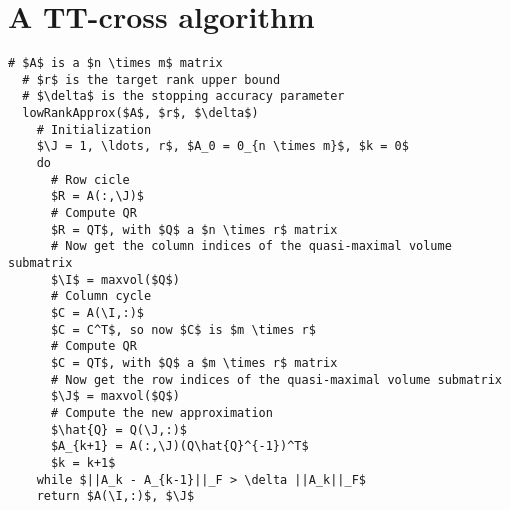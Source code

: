 \section{A TT-cross algorithm}
\begin{lstlisting}[float, caption=Low-rank approximation algorithm, label=algo:cross-approx, title=Low-rank approximation algorithm]
  # $A$ is a $n \times m$ matrix
  # $r$ is the target rank upper bound
  # $\delta$ is the stopping accuracy parameter
  lowRankApprox($A$, $r$, $\delta$)
    # Initialization
    $\J = 1, \ldots, r$, $A_0 = 0_{n \times m}$, $k = 0$
    do
      # Row cicle
      $R = A(:,\J)$
      # Compute QR
      $R = QT$, with $Q$ a $n \times r$ matrix
      # Now get the column indices of the quasi-maximal volume submatrix
      $\I$ = maxvol($Q$)
      # Column cycle
      $C = A(\I,:)$
      $C = C^T$, so now $C$ is $m \times r$
      # Compute QR
      $C = QT$, with $Q$ a $m \times r$ matrix
      # Now get the row indices of the quasi-maximal volume submatrix
      $\J$ = maxvol($Q$)
      # Compute the new approximation
      $\hat{Q} = Q(\J,:)$
      $A_{k+1} = A(:,\J)(Q\hat{Q}^{-1})^T$
      $k = k+1$
    while $||A_k - A_{k-1}||_F > \delta ||A_k||_F$
    return $A(\I,:)$, $\J$
\end{lstlisting}

